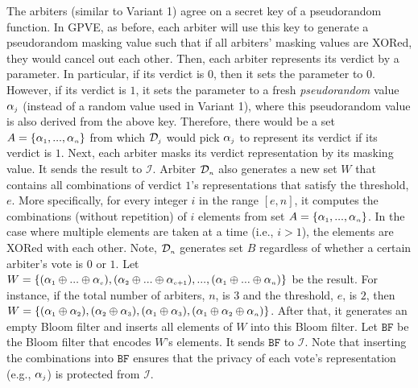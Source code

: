 The arbiters (similar to Variant 1) agree on a secret key of a pseudorandom function. In GPVE,  as before, each arbiter will use this key to  generate a pseudorandom masking value such that if all arbiters' masking values are XORed, they would cancel out each other. Then, each arbiter represents its verdict by a parameter. In particular, if its verdict is $0$, then  it  sets the parameter to  $0$. However, if   its verdict is $1$, it sets the parameter to a fresh \emph{pseudorandom} value $\alpha_{\scriptscriptstyle j}$ (instead of a random value used in Variant 1),  where this  pseudorandom value is also derived from the above key. Therefore, there would be a set $A=\{\alpha_{\scriptscriptstyle 1},..., \alpha_{\scriptscriptstyle n}\}$ from which  $\mathcal{D}_{\scriptscriptstyle j}$ would pick $\alpha_{\scriptscriptstyle j}$ to represent its verdict if its verdict is $1$. Next, each arbiter masks its verdict representation by its masking  value. It sends the result to $\mathcal{I}$. Arbiter $\mathcal{D}_{\scriptscriptstyle n}$ also generates a new set $W$ that contains all  combinations of verdict $1$'s representations that satisfy the threshold, $e$. More specifically,  for every integer $i$ in the range $[e, n]$, it computes the combinations (without repetition) of $i$ elements from set $A=\{\alpha_{\scriptscriptstyle 1},..., \alpha_{\scriptscriptstyle n}\}$. In the case where  multiple elements are taken at a time (i.e., $i>1$), the elements are XORed with each other.   Note, $\mathcal{D}_{\scriptscriptstyle n}$ generates  set $B$  regardless of whether a certain arbiter's  vote is $0$ or $1$. Let $W=\{(\alpha_{\scriptscriptstyle 1}\oplus ... \oplus \alpha_{\scriptscriptstyle e}),  (\alpha_{\scriptscriptstyle 2}\oplus  ... \oplus \alpha_{\scriptscriptstyle e+1}), ..., (\alpha_{\scriptscriptstyle 1}\oplus ... \oplus \alpha_{\scriptscriptstyle n})\}$ be the result. For instance, if the total number of arbiters, $n$, is $3$ and the threshold, $e$, is $2$,  then $W=\{(\alpha_{\scriptscriptstyle 1}\oplus \alpha_{\scriptscriptstyle 2}),  (\alpha_{\scriptscriptstyle 2}\oplus  \alpha_{\scriptscriptstyle 3}), (\alpha_{\scriptscriptstyle 1}\oplus \alpha_{\scriptscriptstyle 3}), (\alpha_{\scriptscriptstyle 1}\oplus \alpha_{\scriptscriptstyle 2} \oplus \alpha_{\scriptscriptstyle n})\}$. After that, it generates an empty Bloom filter and  inserts all elements of $W$ into this Bloom filter. Let $\mathtt{BF}$ be the Bloom filter that encodes $W$'s elements. It sends $\mathtt{BF}$ to $\mathcal{I}$. Note that inserting the combinations into $\mathtt{BF}$ ensures that the privacy of  each vote's representation (e.g., $\alpha_{\scriptscriptstyle j}$) is protected from $\mathcal{I}$. 



